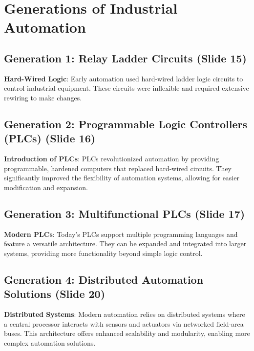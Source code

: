 \documentclass[
  14pt,
  a4paper,
  numbers=noendperiod,
  headinclude=true,
  footinclude=true,
  DIV=calc]{scrreprt}
\begin{document}
\section{Generations of Industrial
Automation}\label{generations-of-industrial-automation}

\subsection{Generation 1: Relay Ladder Circuits (Slide
15)}\label{generation-1-relay-ladder-circuits-slide-15}

\textbf{Hard-Wired Logic}: Early automation used hard-wired ladder logic
circuits to control industrial equipment. These circuits were inflexible
and required extensive rewiring to make changes.

\subsection{Generation 2: Programmable Logic Controllers (PLCs) (Slide
16)}\label{generation-2-programmable-logic-controllers-plcs-slide-16}

\textbf{Introduction of PLCs}: PLCs revolutionized automation by
providing programmable, hardened computers that replaced hard-wired
circuits. They significantly improved the flexibility of automation
systems, allowing for easier modification and expansion.

\subsection{Generation 3: Multifunctional PLCs (Slide
17)}\label{generation-3-multifunctional-plcs-slide-17}

\textbf{Modern PLCs}: Today's PLCs support multiple programming
languages and feature a versatile architecture. They can be expanded and
integrated into larger systems, providing more functionality beyond
simple logic control.

\subsection{Generation 4: Distributed Automation Solutions (Slide
20)}\label{generation-4-distributed-automation-solutions-slide-20}

\textbf{Distributed Systems}: Modern automation relies on distributed
systems where a central processor interacts with sensors and actuators
via networked field-area buses. This architecture offers enhanced
scalability and modularity, enabling more complex automation solutions.
\end{document}
